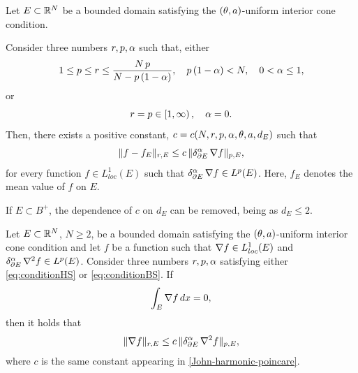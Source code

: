 \documentclass[a4paper,10pt]{amsart}
\numberwithin{equation}{section}
\begin{document}
\begin{lem}
\label{lem:John-two-inequalities}
	Let $E \subset \mathbb{R}^N$ be a bounded domain satisfying the $(\theta,a)$-uniform interior cone condition.
\par
Consider three numbers $r, p, \alpha$ such that, either
	\begin{equation}\label{eq:conditionHS}
		1 \le p \le r \le \frac{N\,p}{N-p\,(1 - \alpha )} , \quad p\,(1 - \alpha)<N , \quad 0 < \alpha \le 1 ,
	\end{equation}
	or
	\begin{equation}\label{eq:conditionBS}
		r = p \in \left[ 1, \infty \right) , \quad \alpha=0.
	\end{equation}
	Then, there exists a positive constant, $c=c(N, r, p, \alpha, \theta, a, d_E)$ such that
	\begin{equation}
		\label{John-harmonic-poincare}
		\Vert f - f_E \Vert_{r,E} \le c\, \Vert \delta_{\partial E}^{\alpha} \, \nabla f  \Vert_{p, E},
	\end{equation}
	for every function $f \in L^1_{loc}(E)$ such that $\delta_{\partial E}^{\alpha} \, \nabla f \in L^p (E)$. Here, $f_E$ denotes the mean value of $f$ on $E$.
	
	If $E \subset B^+$, the dependence of $c$ on $d_E$ can be removed, being as $d_E \le 2$.
\end{lem}
\begin{cor}\label{cor:JohnPoincareaigradienti}
	Let $E\subset\mathbb{R}^N$, $N\ge 2$, be a bounded domain satisfying the $(\theta,a)$-uniform interior cone condition and let $f$ be a function such that
	 $\nabla f \in L^1_{loc}(E)$ and $\delta_{\partial E}^{\alpha} \, \nabla^2 f \in L^p(E)$. Consider three numbers $r, p, \alpha$ 
	satisfying either \eqref{eq:conditionHS} or \eqref{eq:conditionBS}.
	If
	$$\int_E \nabla f \, dx = 0,$$
	then it holds that
	\begin{equation*}
		\Vert \nabla f \Vert_{r, E} \le c \, \Vert \delta_{\partial E}^{\alpha} \, \nabla^2 f  \Vert_{p, E},
	\end{equation*}
	where $c$ is the same constant appearing in \eqref{John-harmonic-poincare}.
\end{cor}
\end{document}

